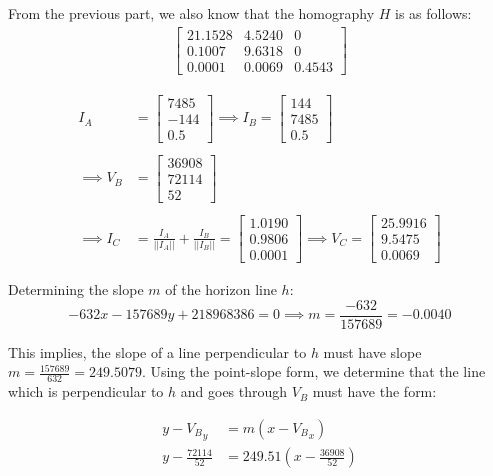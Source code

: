 \documentclass[12pt, oneside]{article}
\begin{document}
From the previous part, we also know that the homography $H$ is as follows:
\begin{align*}
\begin{bmatrix}
    21.1528     &   4.5240  & 0 \\
    0.1007       &   9.6318   & 0 \\
    0.0001       &   0.0069 & 0.4543
\end{bmatrix}
\end{align*}

\begin{align*}
    I_A &= \begin{bmatrix} 7485 \\ -144 \\ 0.5 \end{bmatrix} \implies 
    I_B = \begin{bmatrix} 144 \\ 7485 \\ 0.5 \end{bmatrix}  \\ \\
    \implies  V_B &= \begin{bmatrix} 36908 \\ 72114 \\ 52 \end{bmatrix}   \\ \\ 
    \implies  I_C &= \frac{I_A}{||I_A||}  + \frac{I_B}{||I_B||} = 
    \begin{bmatrix} 1.0190 \\ 0.9806 \\ 0.0001 \end{bmatrix}  \implies
    V_C = 
    \begin{bmatrix} 25.9916 \\ 9.5475 \\ 0.0069 \end{bmatrix} 
\end{align*}

Determining the slope $m$ of the horizon line $h$: 
$$  -632x  -157689y +  218968386 = 0  \implies m = \frac{-632}{157689} = -0.0040$$

This implies, the slope of a line perpendicular to $h$ must have slope $m = 
\frac{157689}{632} = 249.5079$. Using the point-slope form, we determine that the line 
which is perpendicular to $h$ and goes through $V_B$ must have the form:

\begin{align*}
    y - {V_B}_y &= m (x - {V_B}_x)  \\
    y - \frac{72114}{52} &= 249.51 (x - \frac{36908}{52}) 
\end{align*}
\end{document}
